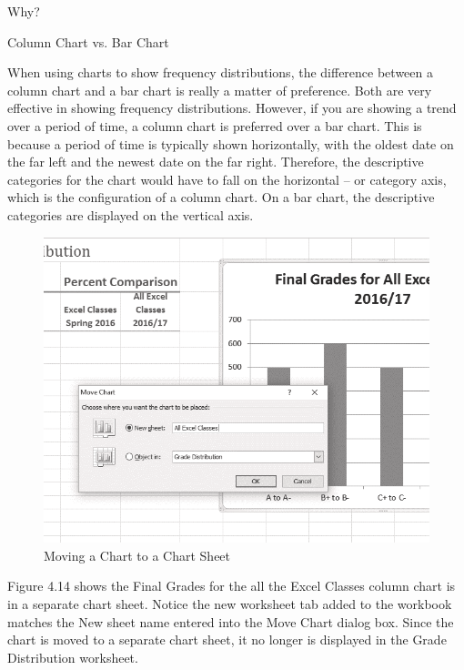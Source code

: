 Why?

Column Chart vs. Bar Chart

When using charts to show frequency distributions, the difference between a column chart and a bar chart is
really a matter of preference. Both are very effective in showing frequency distributions. However, if you are
showing a trend over a period of time, a column chart is preferred over a bar chart. This is because a period of
time is typically shown horizontally, with the oldest date on the far left and the newest date on the far right.
Therefore, the descriptive categories for the chart would have to fall on the horizontal – or category axis, which is
the configuration of a column chart. On a bar chart, the descriptive categories are displayed on the vertical axis.


\begin{figure}[H]
	\centering
	\includegraphics[width=\maxwidth{.95\linewidth}]{gfx/ch04_fig16}
	\caption{Moving a Chart to a Chart Sheet}
	\label{04:fig16}
\end{figure}



Figure 4.14 shows the Final Grades for the all the Excel Classes column chart is in a separate chart
sheet. Notice the new worksheet tab added to the workbook matches the New sheet name entered
into the Move Chart dialog box. Since the chart is moved to a separate chart sheet, it no longer is
displayed in the Grade Distribution worksheet.


